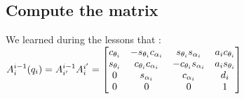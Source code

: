\documentclass[english,a4paper,11pt]{report}
\begin{document}
	\subsection{Compute the matrix}
	We learned during the lessons that :
	$A^{i-1}_{i}(q_{i}) = A^{i-1}_{i\rq{}}A^{i\rq{}}_{i} = 
	\begin{bmatrix} 
	c_{\theta_{i}} & - s_{\theta_{i}} c_{\alpha_{i}} & s_{\theta_{i}} s_{\alpha_{i}} & a_{i} c_{\theta_{i}}\\
	s_{\theta_{i}} &  c_{\theta_{i}} c_{\alpha_{i}} & -c_{\theta_{i}} s_{\alpha_{i}} & a_{i} s_{\theta_{i}}\\
	0 &  s_{\alpha_{i}}  & c_{\alpha_{i}} & d_{i}\\
	0 & 0 & 0 & 1
	\end{bmatrix} $
	
	\newpage

	\listoffigures
	
\end{document}
